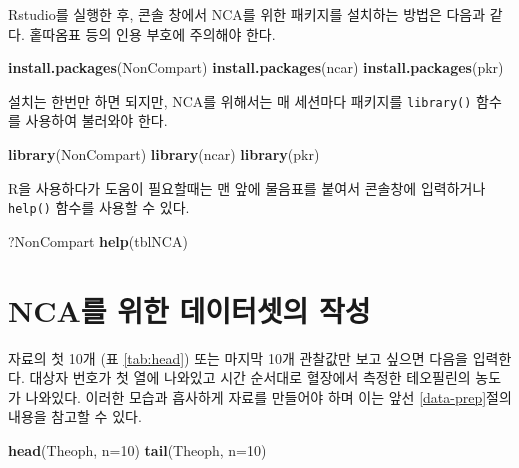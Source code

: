 \documentclass[
  11pt,
  krantz2, a4paper, twoside]{krantz}
\newenvironment{Shaded}{\begin{snugshade}}{\end{snugshade}}
\newcommand{\AttributeTok}[1]{\textcolor[rgb]{0.13,0.29,0.53}{#1}}
\newcommand{\DecValTok}[1]{\textcolor[rgb]{0.00,0.00,0.81}{#1}}
\newcommand{\FunctionTok}[1]{\textcolor[rgb]{0.13,0.29,0.53}{\textbf{#1}}}
\newcommand{\NormalTok}[1]{#1}
\newcommand{\StringTok}[1]{\textcolor[rgb]{0.31,0.60,0.02}{#1}}
\theoremstyle{definition}
\theoremstyle{definition}
\theoremstyle{definition}
\theoremstyle{definition}
\theoremstyle{remark}
\begin{document}
Rstudio를 실행한 후, 콘솔 창에서 NCA를 위한 패키지를 설치하는 방법은 다음과 같다. 홑따옴표 등의 인용 부호에 주의해야 한다.

\begin{Shaded}
\begin{Highlighting}[]
\FunctionTok{install.packages}\NormalTok{(}\StringTok{\textquotesingle{}NonCompart\textquotesingle{}}\NormalTok{)}
\FunctionTok{install.packages}\NormalTok{(}\StringTok{\textquotesingle{}ncar\textquotesingle{}}\NormalTok{)}
\FunctionTok{install.packages}\NormalTok{(}\StringTok{\textquotesingle{}pkr\textquotesingle{}}\NormalTok{)}
\end{Highlighting}
\end{Shaded}

설치는 한번만 하면 되지만, NCA를 위해서는 매 세션마다 패키지를 \texttt{library()} 함수를 사용하여 불러와야 한다.

\begin{Shaded}
\begin{Highlighting}[]
\FunctionTok{library}\NormalTok{(NonCompart)}
\FunctionTok{library}\NormalTok{(ncar)}
\FunctionTok{library}\NormalTok{(pkr)}
\end{Highlighting}
\end{Shaded}

R을 사용하다가 도움이 필요할때는 맨 앞에 물음표를 붙여서 콘솔창에 입력하거나 \texttt{help()} 함수를 사용할 수 있다.

\begin{Shaded}
\begin{Highlighting}[]
\NormalTok{?NonCompart}
\FunctionTok{help}\NormalTok{(tblNCA)}
\end{Highlighting}
\end{Shaded}

\section{NCA를 위한 데이터셋의 작성}\label{ncauxb97c-uxc704uxd55c-uxb370uxc774uxd130uxc14buxc758-uxc791uxc131}

자료의 첫 10개 (표 \ref{tab:head}) 또는 마지막 10개 관찰값만 보고 싶으면 다음을 입력한다.
대상자 번호가 첫 열에 나와있고 시간 순서대로 혈장에서 측정한 테오필린의 농도가 나와있다.
이러한 모습과 흡사하게 자료를 만들어야 하며 이는 앞선 \ref{data-prep}절의 내용을 참고할 수 있다.

\begin{Shaded}
\begin{Highlighting}[]
\FunctionTok{head}\NormalTok{(Theoph, }\AttributeTok{n=}\DecValTok{10}\NormalTok{)}
\FunctionTok{tail}\NormalTok{(Theoph, }\AttributeTok{n=}\DecValTok{10}\NormalTok{)}
\end{Highlighting}
\end{Shaded}
\end{document}
